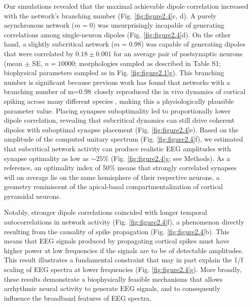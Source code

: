 Our simulations revealed that the maximal achievable dipole correlation increased with the network’s branching number (Fig. \ref{fig:figure2.4}c, d). A purely asynchronous network ($m=0$) was unsurprisingly incapable of generating correlations among single-neuron dipoles (Fig. \ref{fig:figure2.4}d). On the other hand, a slightly subcritical network ($m=0.98$) was capable of generating dipoles that were correlated by $0.18 \pm 0.001$ for an average pair of postsynaptic neurons (mean $\pm$ SE, $n=10000$; morphologies sampled as described in Table S1; biophysical parameters sampled as in Fig. \ref{fig:figure2.1}g). This branching number is significant because previous work has found that networks with a branching number of m=0.98\ closely reproduced the in vivo dynamics of cortical spiking across many different species \cite{Suryadi2022, Wilting2019}, making this a physiologically plausible parameter value. Placing synapses suboptimality led to proportionally lower dipole correlation, revealing that subcritical dynamics can still drive coherent dipoles with suboptimal synapse placement (Fig. \ref{fig:figure2.4}e). Based on the amplitude of the computed unitary spectrum (Fig. \ref{fig:figure2.4}f), we estimated that subcritical network activity can produce realistic EEG amplitudes with synapse optimality as low as ${\sim}25$\% (Fig. \ref{fig:figure2.4}g; see Methods). As a reference, an optimality index of 50\% means that strongly correlated synapses will on average lie on the same hemisphere of their respective neurons, a geometry reminiscent of the apical-basal compartmentalization of cortical pyramidal neurons. 

Notably, stronger dipole correlations coincided with longer temporal autocorrelations in network activity (Fig. \ref{fig:figure2.4}f), a phenomenon directly resulting from the causality of spike propagation (Fig. \ref{fig:figure2.4}b). This means that EEG signals produced by propagating cortical spikes must have higher power at low frequencies if the signals are to be of detectable amplitudes. This result illustrates a fundamental constraint that may in part explain the 1/f scaling of EEG spectra at lower frequencies (Fig. \ref{fig:figure2.4}g). More broadly, these results demonstrate a biophysically feasible mechanisms that allows arrhythmic neural activity to generate EEG signals, and to consequently influence the broadband features of EEG spectra.

